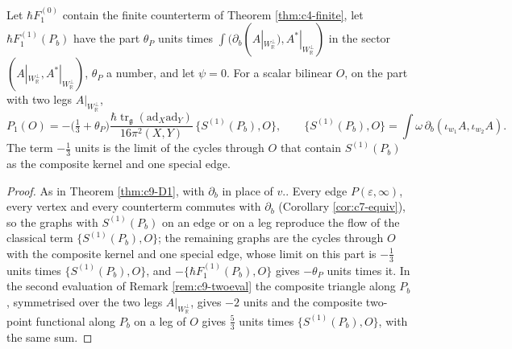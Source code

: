 \begin{theorem}
\label{thm:c9-P1}
Let $\hbar F_1^{(0)}$ contain the finite counterterm of Theorem \ref{thm:c4-finite}, let $\hbar F_1^{(1)}(P_b)$ have the part $\theta_P$ units times $\int(\partial_b(A|_{W_{\mathbb R}^\perp}),A^*|_{W_{\mathbb R}^\perp})$ in the sector $(A|_{W_{\mathbb R}^\perp},A^*|_{W_{\mathbb R}^\perp})$, $\theta_P$ a number, and let $\psi=0$. For a scalar bilinear $O$, on the part with two legs $A|_{W_{\mathbb R}^\perp}$,
\begin{equation}
P_1(O)=-\big(\tfrac13+\theta_P\big)\frac{\hbar\operatorname{tr}_{\mathfrak g}(\mathrm{ad}_X\mathrm{ad}_Y)}{16\pi^2(X,Y)}\,\{S^{(1)}(P_b),O\},\qquad \{S^{(1)}(P_b),O\}=\int\omega\,\partial_b(\iota_{w_1}A,\iota_{w_2}A).
\label{eq:c9-P1}
\end{equation}
The term $-\tfrac13$ units is the limit of the cycles through $O$ that contain $S^{(1)}(P_b)$ as the composite kernel and one special edge.
\end{theorem}

\begin{proof}
As in Theorem \ref{thm:c9-D1}, with $\partial_b$ in place of $v.$. Every edge $P(\varepsilon,\infty)$, every vertex and every counterterm commutes with $\partial_b$ (Corollary \ref{cor:c7-equiv}), so the graphs with $S^{(1)}(P_b)$ on an edge or on a leg reproduce the flow of the classical term $\{S^{(1)}(P_b),O\}$; the remaining graphs are the cycles through $O$ with the composite kernel and one special edge, whose limit on this part is $-\tfrac13$ units times $\{S^{(1)}(P_b),O\}$, and $-\{\hbar F_1^{(1)}(P_b),O\}$ gives $-\theta_P$ units times it. In the second evaluation of Remark \ref{rem:c9-twoeval} the composite triangle along $P_b$, symmetrised over the two legs $A|_{W_{\mathbb R}^\perp}$, gives $-2$ units and the composite two-point functional along $P_b$ on a leg of $O$ gives $\tfrac53$ units times $\{S^{(1)}(P_b),O\}$, with the same sum.
\end{proof}

